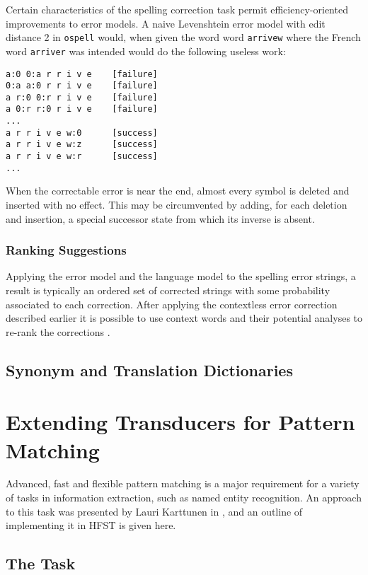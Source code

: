 \documentclass{llncs}
\begin{document}
Certain characteristics of the spelling correction task permit
efficiency-oriented improvements to error models. A naive Levenshtein error
model with edit distance 2 in \verb!ospell! would, when given the word
word \verb!arrivew! where the French word \verb!arriver! was intended would
do the following useless work:

\begin{verbatim}
a:0 0:a r r i v e    [failure]
0:a a:0 r r i v e    [failure]
a r:0 0:r r i v e    [failure]
a 0:r r:0 r i v e    [failure]
...
a r r i v e w:0      [success]
a r r i v e w:z      [success]
a r r i v e w:r      [success]
...
\end{verbatim}

When the correctable error is near the end, almost every symbol is deleted and
inserted with no effect. This may be circumvented by adding, for each deletion
and insertion, a special successor state from which its inverse is absent.

\subsubsection{Ranking Suggestions}

Applying the error model and the language model to the spelling error strings,
a result is typically an ordered set of corrected strings with some probability
associated to each correction. After applying the contextless error correction
described earlier it is possible to use context words and their potential
analyses to re-rank the corrections \cite{pirinen/cicling/2012}.

\subsection{Synonym and Translation Dictionaries}

\section{Extending Transducers for Pattern Matching}
Advanced, fast and flexible pattern matching is a major requirement for a
variety of tasks in information extraction, such as named entity recognition.
An approach to this task was presented by Lauri Karttunen in
\cite{karttunen2011}, and an outline of implementing it in HFST is given here.

\subsection{The Task}
\end{document}
